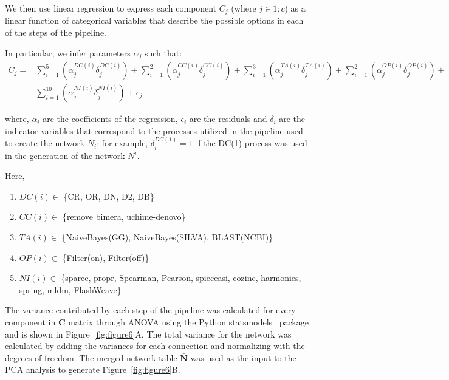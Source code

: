   We then use linear regression to express each component $C_j$ (where $j \in 1:c$) as a linear function of categorical variables that describe the possible options in each of the steps of the pipeline.

  In particular, we infer parameters $\alpha_j$ such that:
  \begin{multline}
  C_j = &\sum_{i=1}^5 \left( \alpha^{DC(i)}_j \delta^{DC(i)}_j \right) +
         \sum_{i=1}^2 \left( \alpha^{CC(i)}_j \delta^{CC(i)}_j \right) +
         \sum_{i=1}^3 \left( \alpha^{TA(i)}_j \delta^{TA(i)}_j \right) +
         \sum_{i=1}^2 \left( \alpha^{OP(i)}_j \delta^{OP(i)}_j \right) + \\
         &\sum_{i=1}^{10} \left( \alpha^{NI(i)}_j \delta^{NI(i)}_j \right) +
         \epsilon_j
  \end{multline}

   where, $\alpha_i$ are the coefficients of the regression, $\epsilon_i$ are the residuals and $\delta_i$ are the indicator variables that correspond to the processes utilized in the pipeline used to create the network $N_i$; for example, $\delta^{DC(1)}_i = 1$ if the DC(1) process was used in the generation of the network $N^i$.

   Here,
   \begin{enumerate}
     \item $DC(i) \in$ \{CR, OR, DN, D2, DB\}
     \item $CC(i) \in$ \{remove bimera, uchime-denovo\}
     \item $TA(i) \in$ \{NaiveBayes(GG), NaiveBayes(SILVA), BLAST(NCBI)\}
     \item $OP(i) \in$ \{Filter(on), Filter(off)\}
     \item $NI(i) \in$ \{\acs{sparcc}, propr, Spearman, Pearson, \acs{spieceasi}, \acs{cozine}, \acs{harmonies}, \acs{spring}, \acs{mldm}, FlashWeave\}
   \end{enumerate}

   The variance contributed by each step of the pipeline was calculated for every component in $\mathbf{C}$ matrix through ANOVA using the Python statsmodels~\cite{seaboldStatsmodelsEconometricStatistical2010} package and is shown in Figure~\ref{fig:figure6}A.
  The total variance for the network was calculated by adding the variances for each connection and normalizing with the degrees of freedom.
  The merged network table $\mathbf{\bar{N}}$ was used as the input to the PCA analysis to generate Figure~\ref{fig:figure6}B.

